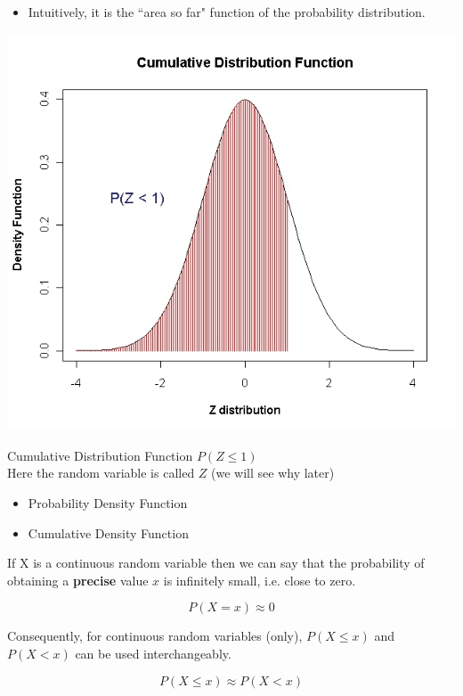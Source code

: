\documentclass[12pt]{report}
\begin{document}
{{\begin{itemize}
		\[ F(x) = P(X \leq x) \]
		
		\item Intuitively, it is the ``area so far" function of the probability distribution.
	\end{itemize}


\begin{center}
	\includegraphics[scale=0.35]{images/6ACDF}
\end{center}
Cumulative Distribution Function $P(Z \leq 1)$ \\ Here the random variable is called $Z$ (we will see why later)


	
	\begin{itemize}
		\item Probability Density Function
		\item Cumulative Density Function
	\end{itemize}
	
	
	If X is a continuous random variable then we can say that the probability of obtaining a \textbf{precise} value $x$ is infinitely small, i.e. close to zero.
	
	\[P(X=x) \approx 0 \]
	
	Consequently, for continuous random variables (only),  $P(X \leq x)$ and $P(X < x)$ can be used interchangeably.
	
	\[P(X \leq x) \approx P(X < x) \]
	
	
}

}
\end{document}
